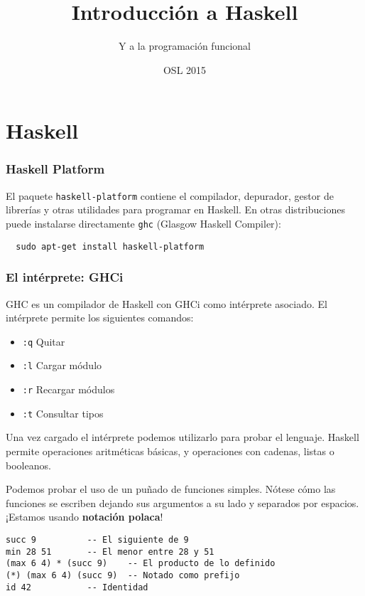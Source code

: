 \documentclass{beamer} %
\title{Introducción a Haskell}  %
\subtitle{Y a la programación funcional}   %
\author[@pbaeyens \and @M42]    %
{\texorpdfstring{
    \begin{columns}
      \column{.45\linewidth}
      \centering
      Pablo Baeyens\\
      \href{http://www.github.com/pbaeyens}{@pbaeyens}
      \column{.45\linewidth}
      \centering
      Mario Román\\
      \href{http://www.github.com/M42}{@M42}
    \end{columns}
}{Pablo Baeyens \and Mario Román}}
\date{OSL 2015} %
\begin{document}
  \frame{\titlepage}



\section{Haskell}
\begin{frame}[fragile]
  \frametitle{Haskell Platform}
  El paquete \texttt{haskell-platform} contiene el compilador, depurador, gestor de 
  librerías y otras utilidades para programar en Haskell.
  En otras distribuciones puede instalarse directamente \texttt{ghc} 
  (Glasgow Haskell Compiler):
  \begin{lstlisting}
  sudo apt-get install haskell-platform
  \end{lstlisting}
\end{frame}

\begin{frame}
  \frametitle{El intérprete: GHCi}
  GHC es un compilador de Haskell con GHCi como intérprete asociado. 
  El intérprete permite los siguientes comandos:
  \begin{itemize}
    \item \texttt{:q} \qquad  Quitar
    \item \texttt{:l} \qquad  Cargar módulo
    \item \texttt{:r} \qquad  Recargar módulos
    \item \texttt{:t} \qquad  Consultar tipos
  \end{itemize}
  
  Una vez cargado el intérprete podemos utilizarlo para probar el lenguaje.
  Haskell permite operaciones aritméticas básicas, y operaciones con
  cadenas, listas o booleanos.
\end{frame}

\begin{frame}[fragile]
  Podemos probar el uso de un puñado de funciones simples. Nótese cómo las funciones
  se escriben dejando sus argumentos a su lado y separados por espacios. ¡Estamos usando
  \textbf{notación polaca}!
  
\begin{lstlisting}
succ 9			-- El siguiente de 9
min 28 51		-- El menor entre 28 y 51
(max 6 4) * (succ 9)	-- El producto de lo definido
(*) (max 6 4) (succ 9)	-- Notado como prefijo
id 42			-- Identidad
\end{lstlisting}
\end{frame}
\end{document}
